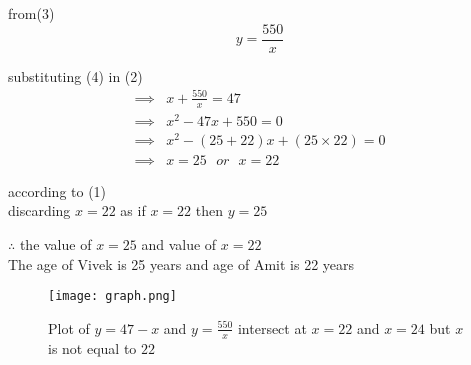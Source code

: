 \documentclass[journal,12pt,twocolumn]{IEEEtran}
\begin{document}
  from(3)
 \begin{equation}
y=\frac{550}{x}     
 \end{equation}
 
 substituting (4) in (2)
 \begin{align*}
    \implies & x+\frac{550}{x}=47\\
    \implies & x^2-47x+550=0\\
    \implies & x^2-(25+22)x+(25\times22)=0\\
    \implies & x=25 \hspace{8pt}or\hspace{8pt} x=22
\end{align*}
\begin{center}
     according to (1)\\
   discarding $x=22$ as if $x=22 $ then $y=25$ \\
\end{center}

 $ \therefore $ the value of $x=25$ and value of $x=22$ \\
The age of Vivek is 25 years and age of Amit is 22 years

\begin{figure}[h!]
    \centering
    \texttt{[image: graph.png]}
    \caption{Plot of  $y=47-x$ and $y=\frac{550}{x}$ intersect at $x=22$ and $x=24$ but $x$ is not equal to $22$}
    \label{fig:my_label}
\end{figure}

 
\end{document}
